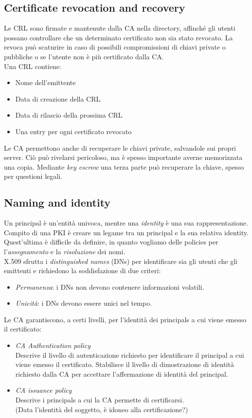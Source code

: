 \documentclass[a4paper, 11pt, notitlepage, fleqn]{report}
\begin{document}
\subsection{Certificate revocation and recovery}
Le CRL sono firmate e mantenute dalla CA nella directory, affinché gli utenti possano controllare che un determinato certificato non sia stato revocato. La revoca può scaturire in caso di possibili compromissioni di chiavi private o pubbliche o se l'utente non è più certificato dalla CA.\\
Una CRL contiene:
\begin{itemize}
	\item Nome dell'emittente
	\item Data di creazione della CRL
	\item Data di rilascio della prossima CRL
	\item Una entry per ogni certificato revocato
\end{itemize}
Le CA permettono anche di recuperare le chiavi private, salvandole sui propri server. Ciò può rivelarsi pericoloso, ma è spesso importante averne memorizzata una copia. Mediante \emph{key escrow} una terza parte può recuperare la chiave, spesso per questioni legali.

\subsection{Naming and identity}
Un principal è un'entità univoca, mentre una \emph{identity} è una sua rappresentazione. Compito di una PKI è creare un legame tra un principal e la sua relativa identity. Quest'ultima è difficile da definire, in quanto vogliamo delle policies per l'\emph{assegnamento} e la \emph{risoluzione} dei nomi.\\
X.509 sfrutta i \emph{distinguished names} (DNs) per identificare sia gli utenti che gli emittenti e richiedono la soddisfazione di due criteri:
\begin{itemize}
	\item \emph{Permanenza}: i DNs non devono contenere informazioni volatili.
	\item \emph{Unicità}: i DNs devono essere unici nel tempo.
\end{itemize}
Le CA garantiscono, a certi livelli, per l'identità dei principals a cui viene emesso il certificato:
\begin{itemize}
	\item \emph{CA Authentication policy}\\
	Descrive il livello di autenticazione richiesto per identificare il principal a cui viene emesso il certificato. Stabilisce il livello di dimostrazione di identità richiesto dalla CA per accettare l'affermazione di identità del principal.
	\item \emph{CA issuance policy}\\
	Descrive i principals a cui la CA permette di certificarsi.\\
	(Data l'identità del soggetto, è idoneo alla certificazione?)
\end{itemize}
\end{document}
